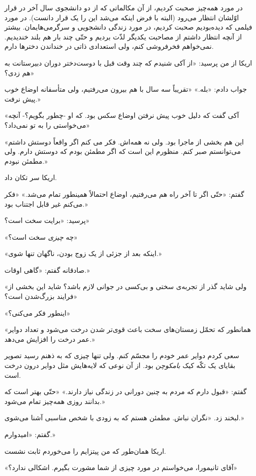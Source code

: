 \documentclass[a5paper]{book}
\begin{document}
در مورد همه‌چیز صحبت کردیم، از آن مکالماتی که از دو دانشجوی سال آخر در قرار اوّلشان انتظار می‌رود (البته با فرض اینکه می‌شد این را یک قرار دانست). در مورد فیلمی که دیده‌بودیم صحبت کردیم، در مورد زندگی‌ دانشجویی و  سرگرمی‌هایمان. بیشتر از آنچه انتظار داشتم از مصاحبت یکدیگر لذّت بردیم و حتّی چند بار هم بلند خندیدیم. نمی‌خواهم فخرفروشی کنم، ولی استعدادی ذاتی در خنداندن دخترها دارم.

اریکا از من پرسید: «از آکی شنیدم که چند وقت قبل با دوست‌دختر دوران دبیرستانت به هم زدی؟»

جواب دادم: «بله.» «تقریباً سه سال با هم بیرون می‌رفتیم، ولی متأسفانه اوضاع خوب پیش نرفت.»

«آکی گفت که دلیل خوب پیش نرفتن اوضاع سکس بود. که او -چطور بگویم؟- آنچه می‌خواستی را به تو نمی‌داد؟»

«این هم بخشی از ماجرا بود. ولی نه همه‌اش. فکر می کنم اگر واقعاً دوستش داشتم می‌توانستم صبر کنم. منظورم این است که اگر مطمئن بودم که دوستش دارم. ولی مطمئن نبودم.»

اریکا سر تکان داد.

گفتم: «حتّی اگر تا آخر راه هم می‌رفتیم، اوضاع احتمالاً همینطور تمام می‌شد.» «فکر می‌کنم غیر قابل اجتناب بود.»

پرسید: «برایت سخت است؟»

«چه \emph{چیزی} سخت است؟»

«اینکه بعد از جزئی از یک زوج بودن، ناگهان تنها شوی.»

صادقانه گفتم: «گاهی اوقات.»

«ولی شاید گذر از تجربه‌ی سختی و بی‌کسی در جوانی لازم باشد؟ شاید این بخشی از فرایند بزرگ‌شدن است؟»

«اینطور فکر می‌کنی؟»

«همانطور که تحمّل زمستان‌های سخت باعث قوی‌تر شدن درخت می‌شود و تعداد دوایر عمر درخت را افزایش می‌دهد.»

سعی کردم دوایر عمر خودم را مجسّم کنم. ولی تنها چیزی که به ذهنم رسید تصویر بقایای یک تکّه کیک \emph{بامکوچن}
بود. از آن نوعی که لایه‌هایش مثل دوایر درون درخت است.

گفتم: «قبول دارم که مردم به چنین دورانی در زندگی نیاز دارند.» «حتّی بهتر است که بدانند روزی همه‌چیز تمام می‌شود.»

لبخند زد. «نگران نباش. مطمئن هستم که به زودی با شخص مناسبی آشنا می‌شوی.»

گفتم: «امیدوارم.»

اریکا همان‌طور که من پیتزایم را می‌خوردم ثابت نشست.

«آقای تانیمورا، می‌خواستم در مورد چیزی از شما مشورت بگیرم. اشکالی ندارد؟»
\end{document}
